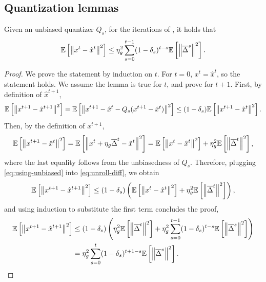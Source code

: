 \subsection{Quantization lemmas}
\label{sec:quantization-lemmas}

\begin{lemma}  \label{lemma:hidden-state-unbiased}
    Given an unbiased quantizer $Q_s$, for the iterations of \algname{}, it holds that
    \begin{equation}
        \mathbb{E}\left[\left\lVert x^{t} - \hat x^{t}\right\rVert^2\right] \leq \eta_g^2 \sum_{s=0}^{t-1} (1-\delta_s)^{t-s} \mathbb{E}\left[\left\lVert\overline{\Delta}^s\right\rVert^2\right].
    \end{equation}
\end{lemma}
\begin{proof}
    We prove the statement by induction on $t$.
    For $t=0$, $x^t = \hat x^t$, so the statement holds.
    We assume the lemma is true for $t$, and prove for $t+1$.
    First, by definition of $\hat x^{t+1}$,
    \begin{equation} \label{eq:unroll-diff}
        \mathbb{E}\left[\left\lVert x^{t+1} - \hat x^{t+1}\right\rVert^2\right] = \mathbb{E}\left[\left\lVert x^{t+1} - \hat x^{t} - Q_s(x^{t+1} - \hat x^t)\right\rVert^2\right] \leq (1-\delta_s) \mathbb{E}\left[\left\lVert x^{t+1} - \hat x^t\right\rVert^2\right].
    \end{equation}
    Then, by the definition of $x^{t+1}$,
    \begin{equation} \label{eq:using-unbiased}
        \mathbb{E}\left[\left\lVert x^{t+1} - \hat x^t\right\rVert^2\right] = \mathbb{E}\left[\left\lVert x^{t} + \eta_g \overline{\Delta}^t - \hat x^t\right\rVert^2\right] = \mathbb{E}\left[\left\lVert x^{t} - \hat x^{t}\right\rVert^2\right] + \eta_g^2 \mathbb{E}\left[\left\lVert\overline{\Delta}^t\right\rVert^2\right],
    \end{equation}
    where the last equality follows from the unbiasedness of $Q_s$.
    Therefore, plugging \eqref{eq:using-unbiased} into \eqref{eq:unroll-diff}, we obtain
    \begin{equation}
        \mathbb{E}\left[\left\lVert x^{t+1} - \hat x^{t+1}\right\rVert^2\right] \leq (1-\delta_s) \left( \mathbb{E}\left[\left\lVert x^{t} - \hat x^{t}\right\rVert^2\right] + \eta_g^2 \mathbb{E}\left[\left\lVert\overline{\Delta}^t\right\rVert^2\right] \right),
    \end{equation}
    and using induction to substitute the first term concludes the proof,
    \begin{equation}
        \begin{aligned}
            \mathbb{E}\left[\left\lVert x^{t+1} - \hat x^{t+1}\right\rVert^2\right] & \leq (1-\delta_s) \left(\eta_g^2 \mathbb{E}\left[\left\lVert\overline{\Delta}^t\right\rVert^2\right] + \eta_g^2 \sum_{s=0}^{t-1} (1-\delta_s)^{t-s} \mathbb{E}\left[\left\lVert\overline{\Delta}^s\right\rVert^2\right]\right) \\
                                                    & = \eta_g^2 \sum_{s=0}^{t} (1-\delta_s)^{t+1-s} \mathbb{E}\left[\left\lVert\overline{\Delta}^s\right\rVert^2\right].
        \end{aligned}
    \end{equation}
\end{proof}

